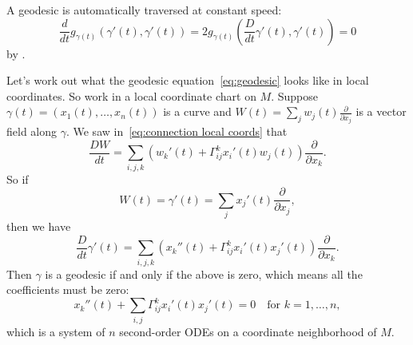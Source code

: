 \begin{remark}
	A geodesic is automatically traversed at constant speed:
	\[
		\frac{d}{dt} g_{\gamma(t)} (\gamma'(t),\gamma'(t)) = 2 g_{\gamma(t)} \left(\frac{D}{dt} \gamma'(t), \gamma'(t)\right) = 0
	\]
	by . 
\end{remark}

Let's work out what the geodesic equation~\eqref{eq:geodesic} looks like in local coordinates. So work in a local coordinate chart on $M$. Suppose $\gamma(t) = (x_1(t),\dots , x_n(t))$ is a curve and $W(t) = \sum_j w_j(t) \frac{\partial}{\partial x_j}$ is a vector field along $\gamma$. We saw in~\eqref{eq:connection local coords} that 
\[
	\frac{DW}{dt} = \sum_{i,j,k}\left( w_k'(t) + \Gamma_{ij}^k x_i'(t) w_j(t)\right)\frac{\partial}{\partial x_k}.
\]
So if
\[
	W(t) = \gamma'(t) = \sum_j x_j'(t) \frac{\partial}{\partial x_j},
\]
then we have
\[
	\frac{D}{dt}\gamma'(t) = \sum_{i,j,k} \left(x_k''(t) + \Gamma_{ij}^k x_i'(t)x_j'(t)\right)\frac{\partial}{\partial x_k}.
\]
Then $\gamma$ is a geodesic if and only if the above is zero, which means all the coefficients must be zero:
\begin{equation}\label{eq:geodesic in coords}
	x_k''(t) + \sum_{i,j} \Gamma_{ij}^k x_i'(t)x_j'(t) = 0 \quad \text{for } k = 1, \dots , n,
\end{equation}
which is a system of $n$ second-order ODEs on a coordinate neighborhood of $M$.


